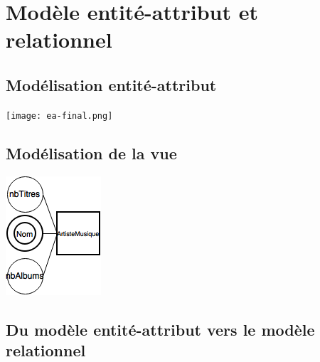 \documentclass[a4paper,12pt, french]{report}
\begin{document}
\chapter{Modèle entité-attribut et relationnel}
\section{Modélisation entité-attribut}
  \texttt{[image: ea-final.png]}
\section{Modélisation de la vue}
  \includegraphics[scale=0.7]{vues.png}
\section{Du modèle entité-attribut vers le modèle relationnel}
\end{document}
